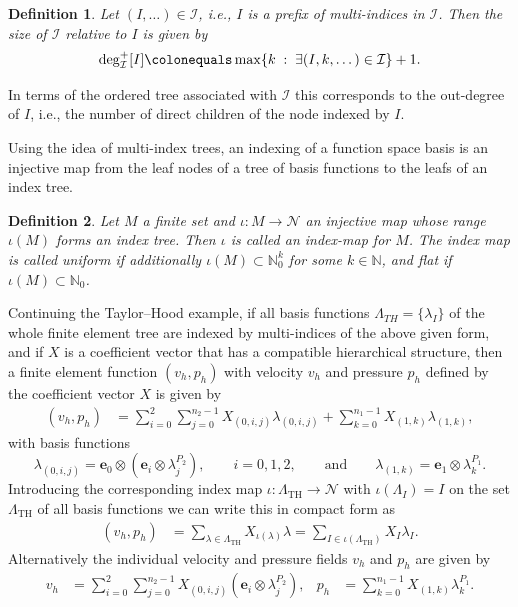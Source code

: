 \documentclass[a4paper,10pt,headings=normal,bibliography=totoc]{scrartcl}
\newtheorem{definition}{Definition}
\newcommand{\op}[1]{\operatorname{#1}}
\newcommand{\st}{\; : \;}
\begin{document}
\begin{definition}
Let $(I,\dots) \in \mathcal{I}$, i.e., $I$ is a
prefix of multi-indices in $\mathcal{I}$. Then the size of $\mathcal{I}$ relative
to $I$ is given by
\begin{align}\label{eq:prefix_size}
  \operatorname{deg}^+_{\mathcal{I}}[I] \colonequals  \op{max}\{k \st \exists (I,k,\dots) \in \mathcal{I} \}+1.
\end{align}
\end{definition}
In terms of the ordered tree associated with $\mathcal{I}$ this corresponds
to the out-degree of $I$, i.e., the number of direct children of the node indexed by $I$.

Using the idea of multi-index trees,
an indexing of a function space basis is an injective map from the leaf nodes of a tree of basis functions to the leafs of an
index tree.

\begin{definition}
  Let $M$ a finite set and $\iota:M \to \mathcal{N}$ an injective map whose range
  $\iota(M)$ forms an index tree.
  Then $\iota$ is called an \emph{index-map} for $M$.
  The index map is called \emph{uniform} if additionally $\iota(M) \subset \mathbb{N}^k_0$ for some $k \in \mathbb{N}$,
  and \emph{flat} if $\iota(M) \subset \mathbb{N}_0$.
\end{definition}

Continuing the Taylor--Hood example, if
all basis functions $\Lambda_{TH} = \{\lambda_I \}$ of the whole finite element tree are
indexed by multi-indices of the above given form,
and if $X$ is a coefficient vector that has a compatible hierarchical structure,
then a finite element function $(v_h,p_h)$ with velocity
$v_h$ and pressure $p_h$ defined by the coefficient vector $X$
is given by
\begin{align*}
  (v_h,p_h)
  &= \sum_{i=0}^2\sum_{j=0}^{n_2-1} X_{(0,i,j)}\lambda_{(0,i,j)}
  + \sum_{k=0}^{n_1-1} X_{(1,k)}\lambda_{(1,k)},
\end{align*}
with basis functions
\begin{equation*}
  \lambda_{(0,i,j)} = \mathbf{e}_0 \otimes (\mathbf{e}_i \otimes \lambda^{P_2}_j), \qquad i=0,1,2,
    \qquad \text{and} \qquad
    \lambda_{(1,k)} = \mathbf{e}_1 \otimes \lambda^{P_1}_k.
\end{equation*}
Introducing the corresponding index map $\iota : \Lambda_{\text{TH}} \to \mathcal{N}$
with $\iota(\Lambda_I)=I$ on the set $\Lambda_{\text{TH}}$ of all basis functions
we can write this in compact form as
\begin{align*}
  (v_h,p_h) &= \sum_{\lambda \in \Lambda_{\text{TH}}} X_{\iota(\lambda)} \lambda
            = \sum_{I \in \iota(\Lambda_{\text{TH}})} X_I \lambda_I.
\end{align*}
Alternatively the individual velocity and pressure fields
$v_h$ and $p_h$ are given by
\begin{align*}
  v_h &= \sum_{i=0}^2 \sum_{j=0}^{n_2-1} X_{(0,i,j)} (\mathbf{e}_i \otimes \lambda^{P_2}_j),
    &
    p_h &= \sum_{k=0}^{n_1-1} X_{(1,k)}\lambda^{P_1}_k.
\end{align*}
\end{document}

